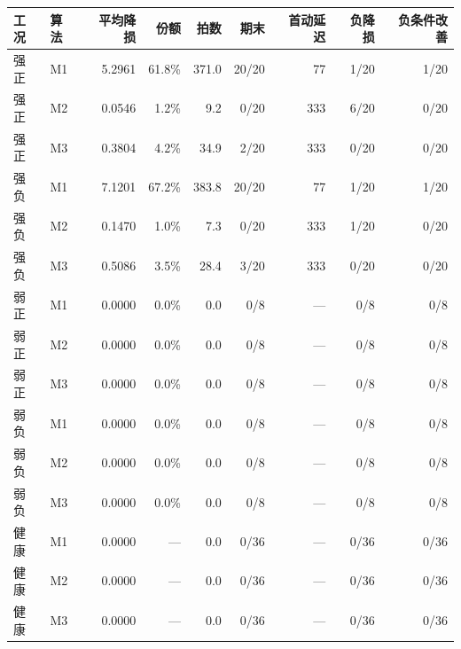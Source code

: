\begin{tabular}{llrrrrrrr}
\toprule
工况 & 算法 & 平均降损 & 份额 & 拍数 & 期末 & 首动延迟 & 负降损 & 负条件改善 \\
\midrule
强正 & M1 & 5.2961 & 61.8\% & 371.0 & 20/20 & 77 & 1/20 & 1/20 \\
强正 & M2 & 0.0546 & 1.2\% & 9.2 & 0/20 & 333 & 6/20 & 0/20 \\
强正 & M3 & 0.3804 & 4.2\% & 34.9 & 2/20 & 333 & 0/20 & 0/20 \\
强负 & M1 & 7.1201 & 67.2\% & 383.8 & 20/20 & 77 & 1/20 & 1/20 \\
强负 & M2 & 0.1470 & 1.0\% & 7.3 & 0/20 & 333 & 1/20 & 0/20 \\
强负 & M3 & 0.5086 & 3.5\% & 28.4 & 3/20 & 333 & 0/20 & 0/20 \\
弱正 & M1 & 0.0000 & 0.0\% & 0.0 & 0/8 & — & 0/8 & 0/8 \\
弱正 & M2 & 0.0000 & 0.0\% & 0.0 & 0/8 & — & 0/8 & 0/8 \\
弱正 & M3 & 0.0000 & 0.0\% & 0.0 & 0/8 & — & 0/8 & 0/8 \\
弱负 & M1 & 0.0000 & 0.0\% & 0.0 & 0/8 & — & 0/8 & 0/8 \\
弱负 & M2 & 0.0000 & 0.0\% & 0.0 & 0/8 & — & 0/8 & 0/8 \\
弱负 & M3 & 0.0000 & 0.0\% & 0.0 & 0/8 & — & 0/8 & 0/8 \\
健康 & M1 & 0.0000 & — & 0.0 & 0/36 & — & 0/36 & 0/36 \\
健康 & M2 & 0.0000 & — & 0.0 & 0/36 & — & 0/36 & 0/36 \\
健康 & M3 & 0.0000 & — & 0.0 & 0/36 & — & 0/36 & 0/36 \\
\bottomrule
\end{tabular}
